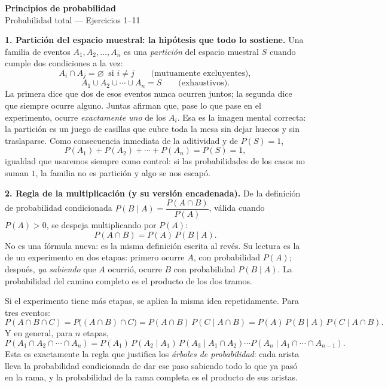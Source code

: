 \documentclass[11pt]{article}
\begin{document}
\begin{center}{\LARGE\bfseries Principios de probabilidad}\\[2pt]{\large Probabilidad total --- Ejercicios 1--11}\end{center}

\vspace{1em}

\begin{teo}
\textbf{1. Partición del espacio muestral: la hipótesis que todo lo sostiene.}
Una familia de eventos $A_1,A_2,\dots,A_n$ es una \emph{partición} del espacio muestral $S$ cuando cumple dos condiciones a la vez:
\[
A_i\cap A_j=\varnothing \ \text{ si } i\neq j
\qquad\text{(mutuamente excluyentes)},
\]
\[
A_1\cup A_2\cup\cdots\cup A_n=S
\qquad\text{(exhaustivos)}.
\]
La primera dice que dos de esos eventos nunca ocurren juntos; la segunda dice que siempre ocurre alguno. Juntas afirman que, pase lo que pase en el experimento, ocurre \emph{exactamente uno} de los $A_i$. Esa es la imagen mental correcta: la partición es un juego de casillas que cubre toda la mesa sin dejar huecos y sin traslaparse. Como consecuencia inmediata de la aditividad y de $P(S)=1$,
\[
P(A_1)+P(A_2)+\cdots+P(A_n)=P(S)=1,
\]
igualdad que usaremos siempre como control: si las probabilidades de los casos no suman $1$, la familia no es partición y algo se nos escapó.

\medskip
\textbf{2. Regla de la multiplicación (y su versión encadenada).}
De la definición de probabilidad condicionada $P(B\mid A)=\dfrac{P(A\cap B)}{P(A)}$, válida cuando $P(A)>0$, se despeja multiplicando por $P(A)$:
\[
P(A\cap B)=P(A)\,P(B\mid A).
\]
No es una fórmula nueva: es la misma definición escrita al revés. Su lectura es la de un experimento en dos etapas: primero ocurre $A$, con probabilidad $P(A)$; después, \emph{ya sabiendo} que $A$ ocurrió, ocurre $B$ con probabilidad $P(B\mid A)$. La probabilidad del camino completo es el producto de los dos tramos.

Si el experimento tiene más etapas, se aplica la misma idea repetidamente. Para tres eventos:
\[
P(A\cap B\cap C)=P\bigl((A\cap B)\cap C\bigr)=P(A\cap B)\,P(C\mid A\cap B)=P(A)\,P(B\mid A)\,P(C\mid A\cap B).
\]
Y en general, para $n$ etapas,
\[
P(A_1\cap A_2\cap\cdots\cap A_n)=P(A_1)\,P(A_2\mid A_1)\,P(A_3\mid A_1\cap A_2)\cdots P(A_n\mid A_1\cap\cdots\cap A_{n-1}).
\]
Esta es exactamente la regla que justifica los \emph{árboles de probabilidad}: cada arista lleva la probabilidad condicionada de dar ese paso sabiendo todo lo que ya pasó en la rama, y la probabilidad de la rama completa es el producto de sus aristas.


\end{teo}
\end{document}
